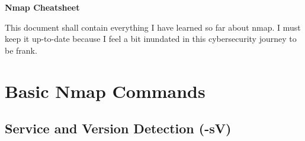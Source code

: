 \documentclass[11pt,a4paper]{article}
\begin{document}
\begin{center}
  \begin{tcolorbox}[width=\textwidth, colback=sectioncolor!20,
    colframe=sectioncolor]
    \centering
    {\Huge \textbf{Nmap Cheatsheet}}\\[0.5em]
  \end{tcolorbox}
\end{center}

\tableofcontents
\clearpage

\vspace{1em}
\begin{tcolorbox}[colback=codebackground, colframe=warningcolor]
  This document shall contain everything I have learned so far about
  nmap. I must keep it up-to-date because I feel a bit inundated in
  this cybersecurity journey to be frank.
\end{tcolorbox}

\section{Basic Nmap Commands}

\subsection{Service and Version Detection (-sV)}
\end{document}

